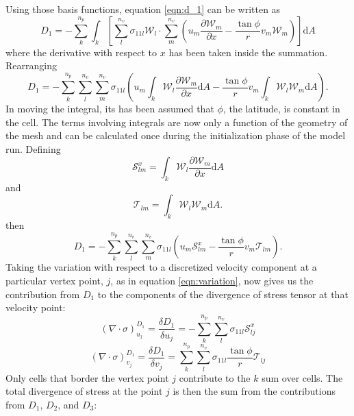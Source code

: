 Using those basis functions, equation \ref{eqn:d_1} can be written as 
\begin{equation}
D_1=-\sum_k^{n_p} \int_k \left[ \sum_{l}^{n_v} \sigma_{11{l}} \mathcal{W}_{l} \cdot \sum_{m}^{n_v} \left(u_{m} \frac{\partial{\mathcal{W}_{m}}}{\partial{x}} - \frac{\tan{\phi}}{r} v_{m} \mathcal{W}_{m} \right) \right]\mathrm{d}A
\end{equation}
where the derivative with respect to $x$ has been taken inside the summation.
Rearranging
\begin{equation}
D_1= -\sum_k^{n_p} \sum_{l}^{n_v} \sum_{m}^{n_v} \sigma_{11{l}}\left( u_{m} \int_k  \mathcal{W}_{l}   \frac{\partial{\mathcal{W}_{m}}}{\partial{x}}  \mathrm{d}A  - \frac{\tan{\phi}}{r}  v_{m} \int_k \mathcal{W}_{l} \mathcal{W}_{m}  \mathrm{d}A  \right).
\end{equation}
In moving the integral, its has been assumed that $\phi$, the latitude, is constant in the cell. The terms involving integrals are now only a function of the geometry of the mesh and can be calculated once during the initialization phase of the model run. Defining 
\begin{equation}
\mathcal{S}^x_{lm} = \int_k  \mathcal{W}_{l}   \frac{\partial{\mathcal{W}_{m}}}{\partial{x}}  \mathrm{d}A
\end{equation}
and
\begin{equation}
\mathcal{T}_{lm} = \int_k \mathcal{W}_{l} \mathcal{W}_{m}  \mathrm{d}A.
\end{equation}
then
\begin{equation}
D_1= -\sum_k^{n_p} \sum_{l}^{n_v} \sum_{m}^{n_v} \sigma_{11{l}}\left( u_{m} \mathcal{S}^x_{lm}  - \frac{\tan{\phi}}{r}  v_{m} \mathcal{T}_{lm}  \right).
\end{equation}
Taking the variation with respect to a discretized velocity component at a particular vertex point, $j$, as in equation \ref{eqn:variation}, now gives us the contribution from $D_1$ to the components of the divergence of stress tensor at that velocity point:
\begin{equation}
(\nabla \cdot \sigma)_{u_j}^{D_1} = \frac{\delta D_1}{\delta u_{j}}= -\sum_k^{n_p} \sum_{l}^{n_v}  \sigma_{11{l}} \mathcal{S}^x_{lj}
\end{equation}
\begin{equation}
(\nabla \cdot \sigma)_{v_j}^{D_1} = \frac{\delta D_1}{\delta v_{j}}= \sum_k^{n_p} \sum_{l}^{n_v}  \sigma_{11{l}}  \frac{\tan{\phi}}{r} \mathcal{T}_{lj}
\end{equation}
Only cells that border the vertex point $j$ contribute to the $k$ sum over cells. The total divergence of stress at the point $j$ is then the sum from the contributions from $D_1$, $D_2$, and $D_3$:
